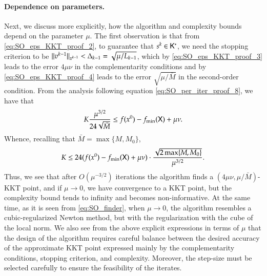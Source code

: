 \paragraph{Dependence on parameters.}
Next, we discuss more explicitly, how the algorithm and complexity bounds depend on the parameter $\mu$. The first observation is that from \eqref{eq:SO_eps_KKT_proof_2}, to guarantee that $s^{k} \in \mathsf{K}^{\ast}$, we need the stopping criterion to be $\lVert v^{k-1}\rVert_{x^{k-1}} < \Delta_{k-1}= \sqrt{\mu/L_{k-1}}$, which by \eqref{eq:SO_eps_KKT_proof_3} leads to the error $4 \mu \nu$ in the complementarity conditions and by \eqref{eq:SO_eps_KKT_proof_4} leads to the error $\sqrt{\mu/\bar{M}}$ in the second-order condition. From the analysis following equation \eqref{eq:SO_per_iter_proof_8}, we have that  
\[
K\frac{\mu^{3/2}}{24  \sqrt{\bar{M}}} %
\leq f(x^{0})-f_{\min}(\setX)+\mu \nu.
\]
Whence, recalling that $\bar{M}=\max\{M,M_0\}$,
\[
K \leq 24(f(x^{0}) - f_{\min}(\setX)+ \mu \nu) \cdot \frac{\sqrt{2\max\{M,M_0\}}}{\mu^{3/2}}.%
\]
Thus, we see that after $O(\mu^{-3/2})$ iterations the algorithm finds a $(4 \mu \nu,\mu/\bar{M})$-KKT point, and  if $\mu \to 0$, we have convergence to a KKT point, but the complexity bound tends to infinity and becomes non-informative. At the same time, as it is seen from \eqref{eq:SO_finder}, when $\mu \to 0$, the algorithm resembles a cubic-regularized Newton method, but with the regularization with the cube of the local norm. We also see from the above explicit expressions in terms of $\mu$ that the design of the algorithm requires careful balance between the desired accuracy of the approximate KKT point expressed mainly by the complementarity conditions, stopping criterion, and complexity. Moreover, the step-size must be selected carefully to ensure the feasibility of the iterates.

